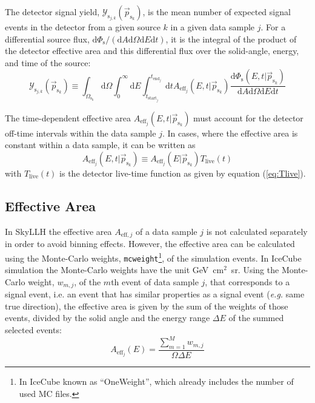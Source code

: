 \documentclass{article}
\newcommand{\code}[1]{\texttt{#1}}
\newcommand{\psk}{\vec{p}_{\mathrm{s}_k}}
\newcommand{\xs}{\vec{x}_{\mathrm{s}}}
\begin{document}
The detector signal yield, $\mathcal{Y}_{\mathrm{s}_{j,k}}(\psk)$,
is the mean number of expected signal events in the detector from a given
source $k$ in a given data sample $j$. For a differential source flux,
$\mathrm{d}\Phi_{\mathrm{s}}/(\mathrm{d}A\mathrm{d}\Omega\mathrm{d}E\mathrm{d}t)$,
it is the integral of the product of the detector effective area and this
differential flux over the solid-angle, energy, and time of the source:
\begin{equation}
 \mathcal{Y}_{\mathrm{s}_{j,k}}(\psk) \equiv \int_{\Omega_{\mathrm{s}_k}} \mathrm{d}\Omega \int_0^\infty \mathrm{d}E \int_{t_{\mathrm{start}_j}}^{t_{\mathrm{end}_j}}\mathrm{d}t A_{\mathrm{eff}_j}(E,t|\psk) \frac{\mathrm{d}\Phi_{\mathrm{s}}(E,t|\psk)}{\mathrm{d}A\mathrm{d}\Omega\mathrm{d}E\mathrm{d}t}
\label{eq:Ysj}
\end{equation}


The time-dependent effective area $A_{\mathrm{eff}_j}(E,t|\psk)$ must account
for the detector off-time intervals within the data sample $j$. In cases, where
the effective area is constant within a data sample, it can be written as
\begin{equation}
 A_{\mathrm{eff}_j}(E,t|\psk) \equiv A_{\mathrm{eff}_j}(E|\psk) T_{\mathrm{live}}(t)
\end{equation}
with $T_{\mathrm{live}}(t)$ is the detector live-time function as given by
equation (\ref{eq:Tlive}).

\subsection{Effective Area}

In SkyLLH the effective area $A_{\mathrm{eff},j}$ of a data sample $j$ is not
calculated separately in order to avoid binning effects. However, the effective
area can be calculated using the Monte-Carlo weights, \code{mcweight}\footnote{In IceCube
known as ``OneWeight'', which already includes the number of used MC files.},
of the simulation events.
In IceCube simulation the Monte-Carlo weights have the unit GeV~cm$^2$~sr.
Using the Monte-Carlo weight, $w_{m,j}$, of the $m$th event of data sample $j$,
that corresponds to a signal event, i.e. an event that has similar properties as
a signal event (\emph{e.g.} same true direction), the effective area is given by
the sum of the weights of those events, divided by the
solid angle and the energy range $\Delta E$ of the summed selected events:
\begin{equation}
 A_{\mathrm{eff}_j}(E) = \frac{\sum_{m=1}^{M} w_{m,j}}{\Omega \Delta E}
\end{equation}
\end{document}

